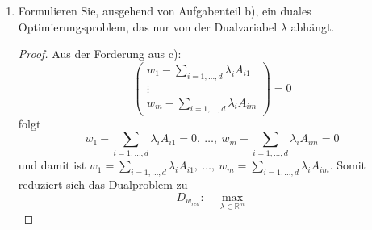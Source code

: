 \documentclass[12pt]{extreport} %
\newcommand{\R}{\mathbb{R}}
\theoremstyle{named}
\theoremstyle{nnamed}
\theoremstyle{itshape}
\theoremstyle{normal}
\begin{document}
\begin{enumerate}
\begin{proof}
\begin{align*}
			& = \left(\begin{array}{c} w_1 -\sum_{i=1,\dotsc,d}  \lambda_i A_{i1}  \\ \vdots \\ w_m -\sum_{i=1,\dotsc,d}  \lambda_i A_{im} \end{array}\right) 
			\end{align*}
		\end{proof}
	\item Formulieren Sie, ausgehend von Aufgabenteil b), ein duales Optimierungsproblem, das nur von der Dualvariabel $\lambda$ abhängt.
		\begin{proof}
			Aus der Forderung aus c):
			$$ \left(\begin{array}{c} w_1 -\sum_{i=1,\dotsc,d}  \lambda_i A_{i1}  \\ \vdots \\ w_m -\sum_{i=1,\dotsc,d}  \lambda_i A_{im} \end{array}\right)  = 0 $$
			folgt
			$$ w_1 -\sum_{i=1,\dotsc,d}  \lambda_i A_{i1} = 0, ~ \dotsc, ~ w_m -\sum_{i=1,\dotsc,d}  \lambda_i A_{im}	= 0 $$
			und damit ist $w_1 = \sum_{i=1,\dotsc,d}  \lambda_i A_{i1}, ~ \dotsc, ~ w_m = \sum_{i=1,\dotsc,d}  \lambda_i A_{im}$.
			Somit reduziert sich das Dualproblem zu
		 	$$ D_{w_{red}}: \quad \max_{\lambda \in \R^m} $$
		\end{proof}
\end{enumerate}
\end{document}
